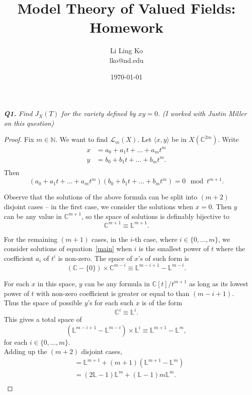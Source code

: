 \documentclass{article}
\begin{document}
\title{Model Theory of Valued Fields: Homework}
\author{Li Ling Ko\\ lko@nd.edu}
\date{\today}
\maketitle

\it \textbf{Q1.} Find $J_X(T)$ for the variety defined by $xy=0$. (I
worked with Justin Miller on this question)
\begin{proof}
  Fix $m\in\mathbb{N}$. We want to find $\mathcal{L}_m(X)$. Let $\langle x,
  y\rangle$ be in $X(\mathbb{C}^{2m})$. Write
  \begin{align*}
    x &=a_0+a_1t+\ldots+a_mt^m\\
    y &=b_0+b_1t+\ldots+b_mt^m.\\
  \end{align*}
  Then
  \begin{equation}
    \label{main}
    (a_0+a_1t+\ldots+a_mt^m) (b_0+b_1t+\ldots+b_mt^m)=0 \mod t^{m+1}.
  \end{equation}

  Observe that the solutions of the above formula can be split into $(m+2)$
  disjoint cases -- in the first case, we consider the solutions when
  $x=0$. Then $y$ can be any value in $\mathbb{C}^{m+1}$, so the space of
  solutions is definably bijective to 
  \[\mathbb{C}^{m+1} \equiv \mathbb{L}^{m+1}.\]

  For the remaining $(m+1)$ cases, in the $i$-th case, where
  $i\in\{0,\ldots,m\}$, we consider solutions of equation~\eqref{main} when
  $i$ is the smallest power of $t$ where the coefficient $a_i$ of $t^i$ is
  non-zero. The space of $x$'s of such form is
  \[(\mathbb{C}-\{0\}) \times\mathbb{C}^{m-i} \equiv
  \mathbb{L}^{m-i+1}-\mathbb{L}^{m-i}.\]

  For each $x$ in this space, $y$ can be any formula in
  $\mathbb{C}[t]/t^{m+1}$ as long as its lowest power of $t$ with non-zero
  coefficient is greater or equal to than $(m-i+1)$. Thus the space of
  possible $y$'s for each such $x$ is of the form
  \[\mathbb{C}^{i} \equiv \mathbb{L}^{i}.\]
  This gives a total space of
  \[(\mathbb{L}^{m-i+1}-\mathbb{L}^{m-i}) \times\mathbb{L}^{i} \equiv
  \mathbb{L}^{m+1}-\mathbb{L}^{m},\]
  for each $i\in\{0,\ldots,m\}$. \\

  Adding up the $(m+2)$ disjoint cases,
  \begin{align*}
    [\mathcal{L}_m(X)] &=\mathbb{L}^{m+1}
      +(m+1)(\mathbb{L}^{m+1}-\mathbb{L}^{m})\\
      &=(2\mathbb{L}-1)\mathbb{L}^m +(\mathbb{L}-1)m\mathbb{L}^m.\\
  \end{align*}


\end{proof}
\end{document}
